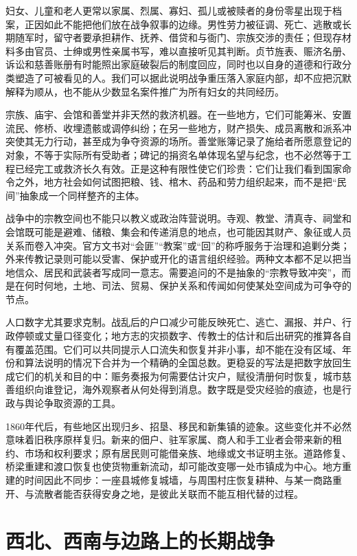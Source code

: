 妇女、儿童和老人更常以家属、烈属、寡妇、孤儿或被赎者的身份零星出现于档案，正因如此不能把他们放在战争叙事的边缘。男性劳力被征调、死亡、逃散或长期随军时，留守者要承担耕作、抚养、借贷和与衙门、宗族交涉的责任；但现存材料多由官员、士绅或男性亲属书写，难以直接听见其判断。贞节旌表、赈济名册、诉讼和慈善账册有时能照出家庭破裂后的制度回应，同时也以自身的道德和行政分类塑造了可被看见的人。我们可以据此说明战争重压落入家庭内部，却不应把沉默解释为顺从，也不能从少数显名案件推广为所有妇女的共同经历。

宗族、庙宇、会馆和善堂并非天然的救济机器。在一些地方，它们可能筹米、安置流民、修桥、收埋遗骸或调停纠纷；在另一些地方，财产损失、成员离散和派系冲突使其无力行动，甚至成为争夺资源的场所。善堂账簿记录了施给者所愿意登记的对象，不等于实际所有受助者；碑记的捐资名单体现名望与纪念，也不必然等于工程已经完工或救济长久有效。正是这种有限性使它们珍贵：它们让我们看到国家命令之外，地方社会如何试图把粮、钱、棺木、药品和劳力组织起来，而不是把“民间”抽象成一个同样整齐的主体。

战争中的宗教空间也不能只以教义或政治阵营说明。寺观、教堂、清真寺、祠堂和会馆既可能是避难、储粮、集会和传递消息的地点，也可能因其财产、象征或人员关系而卷入冲突。官方文书对“会匪”“教案”或“回”的称呼服务于治理和追剿分类；外来传教记录则可能以受害、保护或开化的语言组织经验。两种文本都不足以把当地信众、居民和武装者写成同一意志。需要追问的不是抽象的“宗教导致冲突”，而是在何时何地，土地、司法、贸易、保护关系和传闻如何使某处空间成为可争夺的节点。

人口数字尤其要求克制。战乱后的户口减少可能反映死亡、逃亡、漏报、并户、行政停顿或丈量口径变化；地方志的灾损数字、传教士的估计和后出研究的推算各自有覆盖范围。它们可以共同提示人口流失和恢复并非小事，却不能在没有区域、年份和算法说明的情况下合并为一个精确的全国总数。更稳妥的写法是把数字放回生成它们的机关和目的中：赈务奏报为何需要估计灾户，赋役清册何时恢复，城市慈善组织向谁登记，海外观察者从何处得到消息。数字既是受灾经验的痕迹，也是行政与舆论争取资源的工具。

1860年代后，有些地区出现归乡、招垦、移民和新集镇的迹象。这些变化并不必然意味着旧秩序原样复归。新来的佃户、驻军家属、商人和手工业者会带来新的租约、市场和权利要求；原有居民则可能借亲族、地缘或文书证明主张。道路修复、桥梁重建和渡口恢复也使货物重新流动，却可能改变哪一处市镇成为中心。地方重建的时间因此不同步：一座县城修复城墙，与周围村庄恢复耕种、与某一商路重开、与流散者能否获得安身之地，是彼此关联而不能互相代替的过程。

\section{西北、西南与边路上的长期战争}


